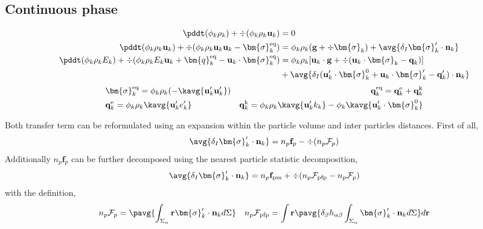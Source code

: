 \subsection{Continuous phase}
\begin{align}
    \label{eq:dt_&vg_rho}
    \pddt (\phi_k \rho_k)  
    + \div (
        \phi_k \rho_k\textbf{u}_k
    )
    &= 
    0\\
    \label{eq:dt_&vg_rhou_k}
    \pddt (\phi_k \rho_k\textbf{u}_k)  
    + \div (
        \phi_k \rho_k\textbf{u}_k\textbf{u}_k
        - \bm{\sigma}_k^\text{eq}
    )
    &= 
    \phi_k \rho_k (\textbf{g} + \div \bm{\sigma}_k )
    +  \avg{\delta_I \bm{\sigma}_k' \cdot \textbf{n}_k}\\
    \label{eq:dt_&vg_rhoE_k}
    \pddt (\phi_k\rho_kE_k)  
    + \div (
        \phi_k\rho_kE_k\textbf{u}_k
        + \bm{q}_k^\text{eq}
        - \textbf{u}_k \cdot \bm{\sigma}_k^\text{eq}
        )
    &= 
    \phi_k \rho_k[\textbf{u}_k \cdot \textbf{g} 
    + \div (\textbf{u}_k\cdot \bm{\sigma}_k - \textbf{q}_k)]\\
    &+ \avg{\delta_I (\textbf{u}_k' \cdot \bm{\sigma}_k^0 + \textbf{u}_k \cdot \bm{\sigma}_k' - \textbf{q}_k')\cdot \textbf{n}_k}
\end{align} 
\begin{align*}
    &\bm{\sigma}_k^\text{eq}
    = \phi_k\rho_k (
        - \kavg{\textbf{u}_k'\textbf{u}_k'})  
    &\textbf{q}_k^\text{eq}
    =\textbf{q}_k^\text{e} 
    +\textbf{q}_k^\text{k}  \\
    &\textbf{q}_k^\text{e}
    = \phi_k\rho_k \kavg{\textbf{u}_k' e_k'} 
    &\textbf{q}_k^\text{k}
    = \phi_k\rho_k \kavg{\textbf{u}_k' k_k} 
    - \phi_k\kavg{\textbf{u}_k' \cdot \bm{\sigma}_k^0}
\end{align*}


Both transfer term can be reformulated using an expansion within the particle volume and inter particles distances. 
First of all, 
\begin{align*}
    \avg{\delta_I \bm{\sigma}_k' \cdot \textbf{n}_k}
    = n_p \textbf{f}_p - \div (n_p \mathcal{F}_p)
\end{align*}
Additionally $n_p \textbf{f}_p$ can be further decomposed using the nearest particle statistic decomposition, 
\begin{align*}
    \avg{\delta_I \bm{\sigma}_k' \cdot \textbf{n}_k}
    = n_p \textbf{f}_\text{pm} + \div (n_p \mathcal{F}_\text{pfp} - n_p \mathcal{F}_p)
\end{align*}
with the definition,
\begin{align*}
    n_p \mathcal{F}_p 
    = \pavg{\int_{\Sigma_\alpha}  \textbf{r} \bm{\sigma}_k' \cdot \textbf{n}_k d\Sigma }
    &&
    n_p \mathcal{F}_\text{pfp} 
    = \int \textbf{r} \pavg{ \delta_\beta  h_{\alpha\beta}\int_{\Sigma_\alpha} \bm{\sigma}_k' \cdot \textbf{n}_k d\Sigma } d\textbf{r}
\end{align*} 

